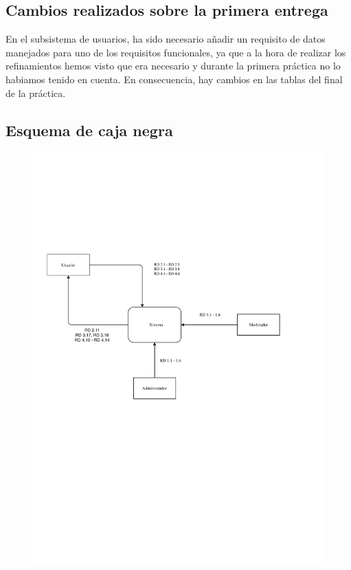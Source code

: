 \subsection{Cambios realizados sobre la primera entrega}

En el subsistema de usuarios, ha sido necesario añadir un requisito de datos manejados para uno de los requisitos funcionales, ya que a la hora de realizar los refinamientos hemos visto que era necesario y durante la primera práctica no lo habiamos tenido en cuenta. En consecuencia, hay cambios en las tablas del final de la práctica.

\subsection{Esquema de caja negra}

\begin{figure}[H]
  \centering
  \includegraphics{diagramas/Caja_negra.pdf}
\end{figure}

